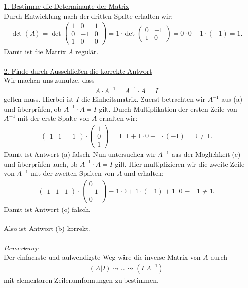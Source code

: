 \underline{1. Bestimme die Determinante der Matrix}\\
Durch Entwicklung nach der dritten Spalte erhalten wir:
\begin{align*}
\det(A) = 
\det
\begin{pmatrix}
1 & 0 & 1 \\
0 & -1 & 0 \\
1 & 0 &0
\end{pmatrix} 
= 1 \cdot \det \begin{pmatrix}
0 & -1\\
1 & 0
\end{pmatrix}
=
0 \cdot 0 - 1 \cdot (-1)
 = 1 .
\end{align*}
Damit ist die Matrix $ A $ regulär.\\
\\
\underline{2. Finde durch Ausschließen die korrekte Antwort}\\
Wir machen uns zunutze, dass
\begin{align*}
A \cdot A^{-1} = A^{-1} \cdot A = I
\end{align*}
gelten muss. Hierbei ist $ I $ die Einheitsmatrix.
Zuerst betrachten wir $ A^{-1} $ aus (a) und überprüfen, ob $ A^{-1} \cdot A = I $ gilt.
Durch Multiplikation der ersten Zeile von $ A^{-1} $ mit der erste Spalte von $ A $ erhalten wir:
\begin{align*}
\begin{pmatrix}
1 & 1 & -1
\end{pmatrix} \cdot 
\begin{pmatrix}
1 \\ 0 \\ 1
\end{pmatrix}
=
1 \cdot 1 + 1 \cdot 0 + 1 \cdot (-1)
=
0
\neq 1. 
\end{align*}
Damit ist Antwort (a) falsch. Nun untersuchen wir $ A^{-1} $ aus der Möglichkeit (c) und überprüfen auch, ob $ A^{-1} \cdot A = I $ gilt.
Hier multiplizieren wir die zweite Zeile von $ A^{-1} $ mit der zweiten Spalten von $ A $ und erhalten:
\begin{align*}
\begin{pmatrix}
1& 1 & 1
\end{pmatrix} \cdot 
\begin{pmatrix}
0 \\ -1 \\ 0
\end{pmatrix}
=
1 \cdot 0 + 1 \cdot (-1) + 1 \cdot 0
=
-1
\neq 1. 
\end{align*}
Damit ist Antwort (c) falsch.\\
\\
Also ist Antwort (b) korrekt.\\
\\
\textit{Bemerkung:}\\
Der einfachste und aufwendigste Weg wäre die inverse Matrix von $ A $ durch 
\begin{align*}
(A | I ) \leadsto ... \leadsto (I | A^{-1})
\end{align*} 
mit elementaren Zeilenumformungen zu bestimmen.
\newpage


